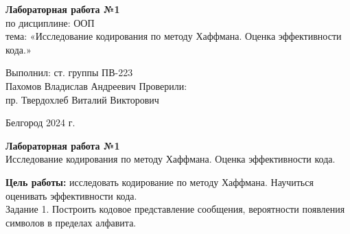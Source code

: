 \documentclass[a4paper,14pt]{extarticle}
\newcommand\textbox[1]{
	\parbox{.45\textwidth}{#1}
}
\begin{document}
\vfill
\begin{center}
    \large{
        \textbf{
            Лабораторная работа №1}}\\
    \normalsize{
        по дисциплине: ООП \\
        тема: «Исследование кодирования по методу Хаффмана. Оценка эффективности кода.»}
\end{center}
\vfill
\hfill\textbox{
    Выполнил: ст. группы ПВ-223\\Пахомов Владислав Андреевич
    \bigbreak
    Проверили: \\пр. Твердохлеб Виталий Викторович
}
\vfill\begin{center}
    Белгород 2024 г.
\end{center}
\newpage
\begin{center}
    \textbf{Лабораторная работа №1}\\
    Исследование кодирования по методу Хаффмана. Оценка эффективности кода.\\
\end{center}
\textbf{Цель работы: }исследовать кодирование по методу Хаффмана. Научиться оценивать эффективности кода.\\
Задание 1. Построить кодовое представление сообщения, вероятности
появления символов в пределах алфавита.\\
\end{document}

